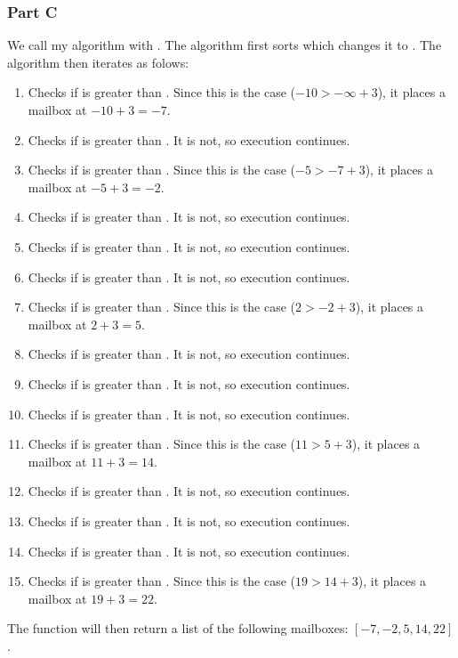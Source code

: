 \documentclass[12pt]{article}
\begin{document}
\subsubsection*{Part C}
We call my algorithm with . The algorithm first sorts  which changes it to \code{[−10, −8, −5, −2, −1, 1, 2, 4, 5, 8, 11, 12, 14, 16, 19]}. The algorithm then iterates as folows:
\begin{enumerate}
\item Checks if  is greater than . Since this is the case ($-10 > -\infty + 3$), it places a mailbox at $-10 + 3 = -7$.
\item Checks if  is greater than . It is not, so execution continues.
\item Checks if  is greater than . Since this is the case ($-5 > -7 + 3$), it places a mailbox at $-5 + 3 = -2$.
\item Checks if  is greater than . It is not, so execution continues.
\item Checks if  is greater than . It is not, so execution continues.
\item Checks if  is greater than . It is not, so execution continues.
\item Checks if  is greater than . Since this is the case ($2 > -2 + 3$), it places a mailbox at $2 + 3 = 5$.
\item Checks if  is greater than . It is not, so execution continues.
\item Checks if  is greater than . It is not, so execution continues.
\item Checks if  is greater than . It is not, so execution continues.
\item Checks if  is greater than . Since this is the case ($11 > 5 + 3$), it places a mailbox at $11 + 3 = 14$.
\item Checks if  is greater than . It is not, so execution continues.
\item Checks if  is greater than . It is not, so execution continues.
\item Checks if  is greater than . It is not, so execution continues.
\item Checks if  is greater than . Since this is the case ($19 > 14 + 3$), it places a mailbox at $19 + 3 = 22$.
\end{enumerate}
The function will then return a list of the following mailboxes: $[-7, -2, 5, 14, 22]$.
\end{document}

